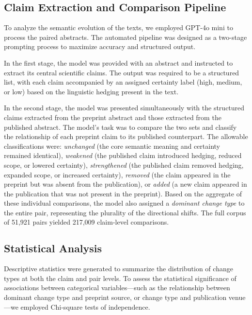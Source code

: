 \documentclass[11pt]{article}
\begin{document}
\subsection{Claim Extraction and Comparison Pipeline}

To analyze the semantic evolution of the texts, we employed GPT-4o mini \cite{openai2023} to process the paired abstracts. The automated pipeline was designed as a two-stage prompting process to maximize accuracy and structured output.

In the first stage, the model was provided with an abstract and instructed to extract its central scientific claims. The output was required to be a structured list, with each claim accompanied by an assigned certainty label (high, medium, or low) based on the linguistic hedging present in the text.

In the second stage, the model was presented simultaneously with the structured claims extracted from the preprint abstract and those extracted from the published abstract. The model's task was to compare the two sets and classify the relationship of each preprint claim to its published counterpart. The allowable classifications were: \textit{unchanged} (the core semantic meaning and certainty remained identical), \textit{weakened} (the published claim introduced hedging, reduced scope, or lowered certainty), \textit{strengthened} (the published claim removed hedging, expanded scope, or increased certainty), \textit{removed} (the claim appeared in the preprint but was absent from the publication), or \textit{added} (a new claim appeared in the publication that was not present in the preprint). Based on the aggregate of these individual comparisons, the model also assigned a \textit{dominant change type} to the entire pair, representing the plurality of the directional shifts. The full corpus of 51,921 pairs yielded 217,009 claim-level comparisons.

\subsection{Statistical Analysis}

Descriptive statistics were generated to summarize the distribution of change types at both the claim and pair levels. To assess the statistical significance of associations between categorical variables---such as the relationship between dominant change type and preprint source, or change type and publication venue---we employed Chi-square tests of independence.
\end{document}
